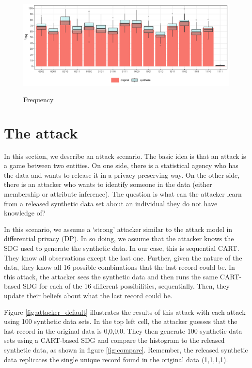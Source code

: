 \documentclass[runningheads]{llncs}
\begin{document}
\begin{figure}[!h]
    \centering
    \caption{Frequency}
    \includegraphics[width=\textwidth]{../graphs/graph_cart_histogram_compare_100.pdf}
    \label{fig:cart_histogram_compare_100}
\end{figure}

\section{The attack}

In this section, we describe an attack scenario.  The basic idea is that an attack is a game between two entities.  On one side, there is a statistical agency who has the data and wants to release it in a privacy preserving way.  On the other side, there is an attacker who wants to identify someone in the data (either membership or attribute inference). The question is what can the attacker learn from a released synthetic data set about an individual they do not have knowledge of?

In this scenario, we assume a `strong' attacker similar to the attack model in differential privacy (DP).  In so doing, we assume that the attacker knows the SDG used to generate the synthetic data.  In our case, this is sequential CART.  They know all observations except the last one.  Further, given the nature of the data, they know all 16 possible combinations that the last record could be.  In this attack, the attacker sees the synthetic data and then runs the same CART-based SDG for each of the 16 different possibilities, sequentially.  Then, they update their beliefs about what the last record could be.

Figure \ref{fig:attacker_default} illustrates the results of this attack with each attack using 100 synthetic data sets.  In the top left cell, the attacker guesses that the last record in the original data is 0,0,0,0.  They then generate 100 synthetic data sets using a CART-based SDG and compare the histogram to the released synthetic data, as shown in figure \ref{fig:compare}.  Remember, the released synthetic data replicates the single unique record found in the original data (1,1,1,1).  
\end{document}
